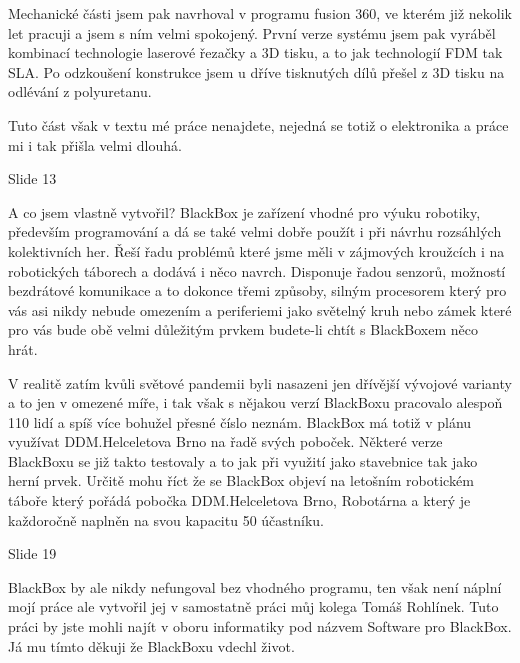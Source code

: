 Mechanické části jsem pak navrhoval v programu fusion 360, ve kterém již nekolik let pracuji a jsem s ním velmi spokojený.
První verze systému jsem pak vyráběl kombinací technologie laserové řezačky a 3D tisku, a to jak technologií FDM tak SLA.
Po odzkoušení konstrukce jsem u dříve tisknutých dílů přešel z 3D tisku na odlévání z polyuretanu. 

Tuto část však v textu mé práce nenajdete, nejedná se totiž o elektronika a práce mi i tak přišla velmi dlouhá.


Slide 13

A co jsem vlastně vytvořil? 
BlackBox je zařízení vhodné pro výuku robotiky, především programování a dá se také velmi dobře použít i při návrhu rozsáhlých 
kolektivních her. Řeší řadu problémů které jsme měli v zájmových kroužcích i na robotických táborech a dodává i něco navrch.
Disponuje řadou senzorů, možností bezdrátové komunikace a to dokonce třemi způsoby, silným procesorem který pro vás asi nikdy nebude omezením
a periferiemi jako světelný kruh nebo zámek které pro vás bude obě velmi důležitým prvkem budete-li chtít s BlackBoxem něco hrát.

V realitě zatím kvůli světové pandemii byli nasazeni jen dřívější vývojové varianty a to jen v omezené míře, i tak však s nějakou verzí BlackBoxu 
pracovalo alespoň 110 lidí a spíš více bohužel přesné číslo neznám. BlackBox má totiž v plánu využívat DDM.Helceletova Brno na řadě svých poboček.
Některé verze BlackBoxu se již takto testovaly a to jak při využití jako stavebnice tak jako herní prvek. Určitě mohu říct že se BlackBox objeví 
na letošním robotickém táboře který pořádá pobočka DDM.Helceletova Brno, Robotárna a který je každoročně naplněn na svou kapacitu 50 účastníku. %





Slide 19

BlackBox by ale nikdy nefungoval bez vhodného programu, ten však není náplní mojí práce ale vytvořil jej v samostatně 
práci můj kolega Tomáš Rohlínek. Tuto práci by jste mohli najít v oboru informatiky pod názvem Software pro BlackBox.
Já mu tímto děkuji že BlackBoxu vdechl život.

